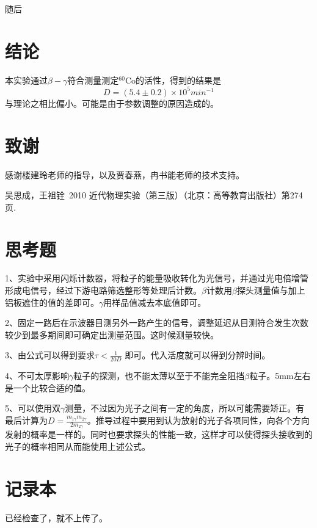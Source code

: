 \documentclass[aps,pre,12pt,preprint,onecolumn,showpacs,showkeys,UTF8]{revtex4-1}
\begin{document}
\newpage

随后

\section{结论}

本实验通过$\beta-\gamma$符合测量测定$^{60}$Co的活性，得到的结果是
\begin{equation}
	D=(5.4\pm0.2)\times10^5 min^{-1}
\end{equation}
与理论之相比偏小。可能是由于参数调整的原因造成的。

\section{致谢} 
感谢楼建玲老师的指导，以及贾春燕，冉书能老师的技术支持。


\begin{thebibliography}{}
	 吴思成，王祖铨~2010 近代物理实验（第三版）（北京：高等教育出版社）第274页.%
%
\end{thebibliography}

\clearpage
\appendix
\section{思考题}

1、实验中采用闪烁计数器，将粒子的能量吸收转化为光信号，并通过光电倍增管形成电信号，经过下游电路筛选整形等处理后计数。$\beta$计数用$\beta$探头测量值与加上铝板遮住的值的差即可。$\gamma$用样品值减去本底值即可。

2、固定一路后在示波器目测另外一路产生的信号，调整延迟从目测符合发生次数较少到最多期间即可确定出测量范围。这时候测量较快。

3、由公式可以得到要求$\tau < \frac{1}{20D}$ 即可。代入活度就可以得到分辨时间。

4、不可太厚影响$\gamma$粒子的探测，也不能太薄以至于不能完全阻挡$\beta$粒子。5mm左右是一个比较合适的值。

5、可以使用双$\gamma$测量，不过因为光子之间有一定的角度，所以可能需要矫正。有最后计算为$D=\frac{m_{1\gamma}m_{2\gamma}}{2m_{2\gamma}}$。推导过程中要用到认为放射的光子各项同性，向各个方向发射的概率是一样的。同时也要求探头的性能一致，这样才可以使得探头接收到的光子的概率相同从而能使用上述公式。

\section{记录本}
已经检查了，就不上传了。
\end{document}
